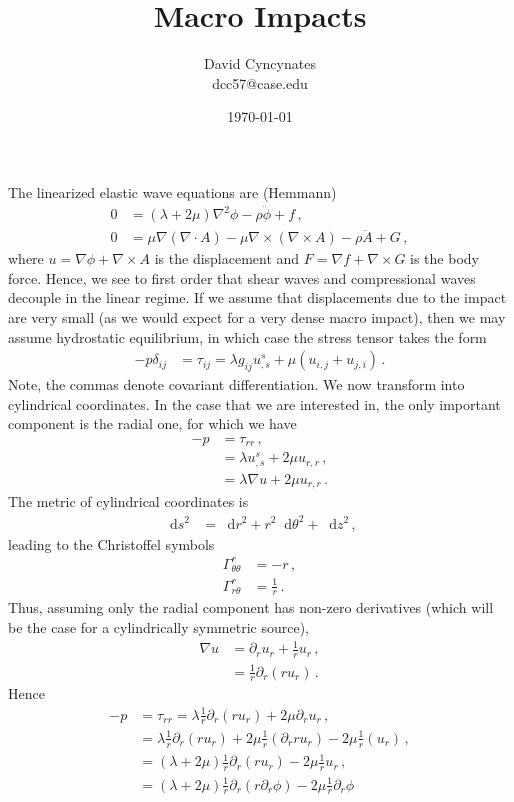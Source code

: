 \documentclass{article}
\title{Macro Impacts}
\author{David Cyncynates \\ dcc57@case.edu}
\date{\today}
\newcommand*\diff{\mathop{}\!\mathrm{d}}
\newcommand*\f[2]{\frac{#1}{#2}}
\begin{document}
\maketitle
The linearized elastic wave equations are (Hemmann)
\begin{align}
0&=(\lambda+2\mu)\nabla^2\phi-\rho\ddot\phi+f\,,\\
0&=\mu\nabla(\nabla\cdot A)-\mu\nabla\times(\nabla\times A)-\rho\ddot A+G\,,
\end{align}
where $u=\nabla\phi+\nabla\times A$ is the displacement and $F=\nabla f+\nabla\times G$ is the body force. Hence, we see to first order that shear waves and compressional waves decouple in the linear regime. If we assume that displacements due to the impact are very small (as we would expect for a very dense macro impact), then we may assume hydrostatic equilibrium, in which case the stress tensor takes the form
\begin{align}
-p\delta_{ij}&=\tau_{ij}=\lambda g_{ij} u^s_{,s}+\mu(u_{i,j}+u_{j,i})\,.
\end{align}
Note, the commas denote covariant differentiation. We now transform into cylindrical coordinates. In the case that we are interested in, the only important component is the radial one, for which we have
\begin{align}
-p&=\tau_{rr}\,,\\
&=\lambda u^s_{,s}+2\mu u_{r,r}\,,\\
&=\lambda \nabla u+2\mu u_{r,r}\,.
\end{align}
The metric of cylindrical coordinates is
\begin{align}
\diff s^2&=\diff r^2+r^2\diff\theta^2+\diff z^2\,,
\end{align}
leading to the Christoffel symbols
\begin{align}
\Gamma^r_{\theta\theta}&=-r\,,\\
\Gamma^r_{r\theta}&=\f1r\,.
\end{align}
Thus, assuming only the radial component has non-zero derivatives (which will be the case for a cylindrically symmetric source),
\begin{align}
\nabla u&=\partial_r u_r+\f1r u_r\,,\\
&=\f1r\partial_r(ru_r)\,.
\end{align}
Hence
\begin{align}
-p&=\tau_{rr}=\lambda\f1r\partial_r(ru_r)+2\mu\partial_r u_r\,,\\
&=\lambda\f1r\partial_r(ru_r)+2\mu\f1r(\partial_r ru_r)-2\mu\f1r(u_r)\,,\\
&=(\lambda+2\mu)\f1r\partial_r(ru_r)-2\mu\f1ru_r\,,\\
&=(\lambda+2\mu)\f1r\partial_r(r\partial_r\phi)-2\mu\f1r\partial_r\phi
\end{align}
\end{document}
